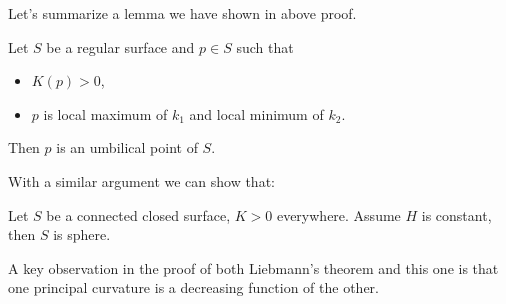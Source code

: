 Let's summarize a lemma we have shown in above proof.
\begin{lemma}
    Let \(S\) be a regular surface and \(p\in S\) such that
    \begin{itemize}
    \item \(K(p)>0\),
    \item \(p\) is local maximum of \(k_1\) and local minimum of \(k_2\).
    \end{itemize}
    Then \(p\) is an umbilical point of \(S\).
\end{lemma}

\begin{remark}
    With a similar argument we can show that:
\end{remark}
\begin{theorem}
    Let \(S\) be a connected closed surface, \(K>0\) everywhere. Assume \(H\) is
    constant, then \(S\) is sphere.
\end{theorem}
A key observation in the proof of both Liebmann's theorem and this one is that
one principal curvature is a decreasing function of the other.

